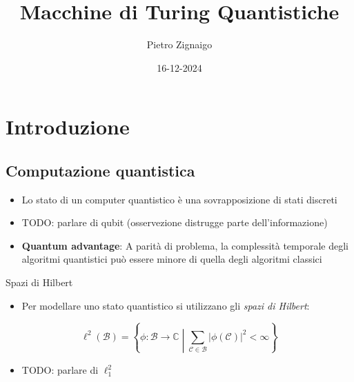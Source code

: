 \documentclass{beamer}
\title
{Macchine di Turing Quantistiche}
\author
{Pietro Zignaigo}
\institute
{Università di Genova}
\date
{16-12-2024}
\def\spacedmiddle#1{\mathrel{}\middle#1\mathrel{}}
\begin{document}
\begin{frame}
	\titlepage
\end{frame}

\begin{frame}
	\tableofcontents
\end{frame}

\section{Introduzione}

\subsection{Computazione quantistica}

\begin{frame}{\subsecname}{}
	\begin{itemize}
		\item Lo stato di un computer quantistico è una sovrapposizione di stati discreti
		\item TODO: parlare di qubit (osservezione distrugge parte dell'informazione)
		\item \textbf{Quantum advantage}: A parità di problema, la complessità temporale degli algoritmi quantistici può essere minore di quella degli algoritmi classici
	\end{itemize}
\end{frame}

\begin{frame}{\subsecname}{Spazi di Hilbert}
	\begin{itemize}
		\item Per modellare uno stato quantistico si utilizzano gli \textit{spazi di Hilbert}:
	\end{itemize}
	\[ \ell^{2} \left ( \mathcal{B} \right ) = \left \{ \phi : \mathcal{B} \rightarrow \mathbb{C} \spacedmiddle | \sum_{\mathcal{C} \in \mathcal{B}} \left | \phi \left ( \mathcal{C} \right ) \right |^{2} < \infty \right \}\]
	\begin{itemize}
		\item TODO: parlare di \(\ell^{2}_{1}\)
	\end{itemize}
\end{frame}
\end{document}
